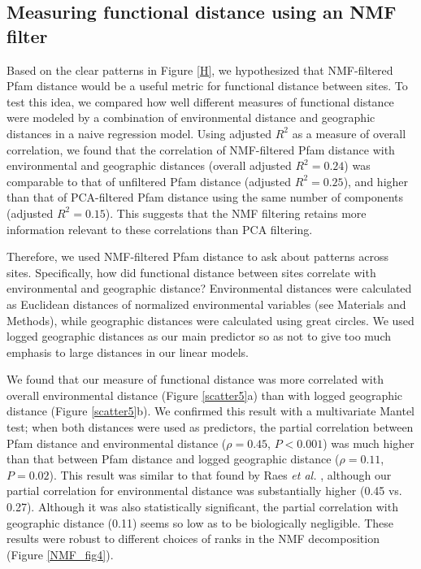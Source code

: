 
\subsection{Measuring functional distance using an NMF filter}

Based on the clear patterns in Figure \ref{H}, we hypothesized that NMF-filtered Pfam distance would be a useful metric for functional distance between sites. To test this idea, we compared how well different measures of functional distance were modeled by a combination of environmental distance and geographic distances in a naive regression model.  Using adjusted $R^2$ as a measure of overall correlation, we found that the correlation of NMF-filtered Pfam distance with environmental and geographic distances (overall adjusted $R^2 = 0.24$) was comparable to that of unfiltered Pfam distance (adjusted $R^2 = 0.25$), and higher than that of PCA-filtered Pfam distance using the same number of components (adjusted $R^2 = 0.15$). This suggests that the NMF filtering retains more information relevant to these correlations than PCA filtering.

Therefore, we used NMF-filtered Pfam distance to ask about patterns across sites. Specifically, how did functional distance between sites correlate with environmental and geographic distance?  Environmental distances were calculated as Euclidean distances of normalized environmental variables (see Materials and Methods), while geographic distances were calculated using great circles. We used logged geographic distances as our main predictor so as not to give too much emphasis to large distances in our linear models.

We found that our measure of functional distance was more correlated with overall environmental distance (Figure \ref{scatter5}a) than with logged geographic distance (Figure \ref{scatter5}b). We confirmed this result with a multivariate Mantel test; when both distances were used as predictors, the partial correlation between Pfam distance and environmental distance ($\rho=0.45$, $P < 0.001$) was much higher than that between Pfam distance and logged geographic distance ($\rho=0.11$, $P=0.02$). This result was similar to that found by Raes {\em et al.} \cite{raes_toward_2011}, although our partial correlation for environmental distance was substantially higher (0.45 vs. 0.27).  Although it was also statistically significant, the partial correlation with geographic distance (0.11) seems so low as to be biologically negligible. These results were robust to different choices of ranks in the NMF decomposition (Figure \ref{NMF_fig4}).

